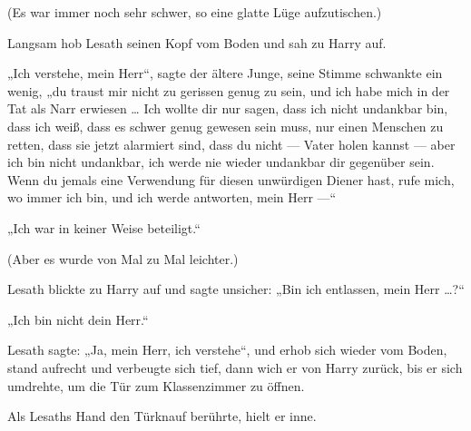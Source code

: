 (Es war immer noch sehr schwer, so eine glatte Lüge aufzutischen.)

Langsam hob Lesath seinen Kopf vom Boden und sah zu Harry auf.

„Ich verstehe, mein Herr“, sagte der ältere Junge, seine Stimme schwankte ein wenig, „du traust mir nicht zu gerissen genug zu sein, und ich habe mich in der Tat als Narr erwiesen … Ich wollte dir nur sagen, dass ich nicht undankbar bin, dass ich weiß, dass es schwer genug gewesen sein muss, nur einen Menschen zu retten, dass sie jetzt alarmiert sind, dass du nicht — Vater holen kannst — aber ich bin nicht undankbar, ich werde nie wieder undankbar dir gegenüber sein. Wenn du jemals eine Verwendung für diesen unwürdigen Diener hast, rufe mich, wo immer ich bin, und ich werde antworten, mein Herr —“

„Ich war in keiner Weise beteiligt.“

(Aber es wurde von Mal zu Mal leichter.)

Lesath blickte zu Harry auf und sagte unsicher:
„Bin ich entlassen, mein Herr …?“

„Ich bin nicht dein Herr.“

Lesath sagte:
„Ja, mein Herr, ich verstehe“, und erhob sich wieder vom Boden, stand aufrecht und verbeugte sich tief, dann wich er von Harry zurück, bis er sich umdrehte, um die Tür zum Klassenzimmer zu öffnen.

Als Lesaths Hand den Türknauf berührte, hielt er inne.


